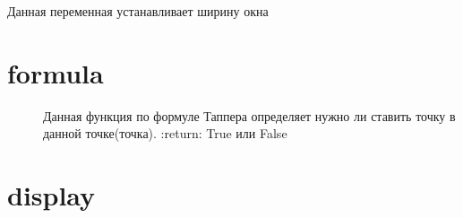 \documentclass[a4paper,10pt,russian]{sphinxmanual}
\begin{document}
\begin{fulllineitems}
\label{\detokenize{index:config.SCREEN_WIDTH}}
\pysigstartsignatures
{}
\pysigstopsignatures
\sphinxAtStartPar
{}
Данная переменная устанавливает ширину окна

\end{fulllineitems}



\section{formula}
\label{\detokenize{index:module-formula}}\label{\detokenize{index:formula}}

\begin{fulllineitems}
\label{\detokenize{index:formula.should_pixel_be_drawn}}
\pysigstartsignatures
{}
\pysigstopsignatures\begin{description}
\item[{}] \leavevmode
\sphinxAtStartPar
Данная функция по формуле Таппера определяет нужно ли ставить точку в данной точке(точка).
:return: True или False

\end{description}

\end{fulllineitems}



\section{display}
\label{\detokenize{index:module-display}}\label{\detokenize{index:display}}
\end{document}
